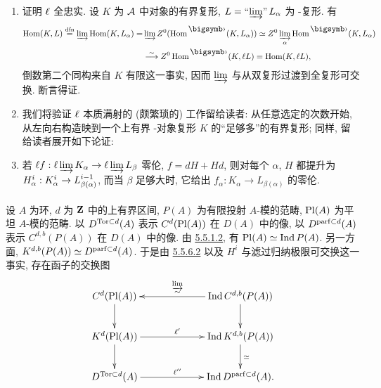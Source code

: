 \begin{enumerate}
\renewcommand{\theenumi}{\Alph{enumi}}
\renewcommand{\labelenumi}{\theenumi)}
\item 证明 $\ell$ 全忠实. 设 $K$ 为 ${\mathcal A}$ 中对象的有界复形, $L=\operatorname*{\text{``$\varinjlim$''}}
L_{\alpha}$ 为 \iInd-复形. 有
\begin{align*}
\Hom(K,L)\overset{\dfn}{=} \varinjlim \Hom(K,L_{\alpha})  = & \varinjlim
Z^{0}(\Hom^{\bigdot} (K,L_{\alpha}))\simeq Z^{0}
\varinjlim_{\alpha} \Hom^{\bigdot} (K,L_{\alpha})\\
& \isomto
Z^{0} \Hom^{\bigdot} (K,\ell L)=\Hom(K,\ell L){\quoi},
\end{align*}
倒数第二个同构来自 $K$ 有限这一事实, 因而 $\varinjlim$ 与从双复形过渡到全复形可交换. 断言得证.

\item 我们\pageoriginale 将验证 $\ell$ 本质满射的 (颇繁琐的) 工作留给读者: 从任意选定的次数开始, 从左向右构造映到一个上有界 \iInd-对象复形 $K$ 的“足够多”的有界复形; 同样, 留给读者展开如下论证:

\item 若 $\ell f:\ell \varinjlim K_{\alpha}\rightarrow \ell \varinjlim
L_{\beta}$ 零伦, $f=dH+Hd$, 则对每个 $\alpha$, $H$ 都提升为 $H^{i}_{\alpha}:K^{i}_{\alpha}\rightarrow
L^{i-1}_{\beta(\alpha)}$, 而当 $\beta$ 足够大时, 它给出 $f_{\alpha}:K_{\alpha}\rightarrow L_{\beta(\alpha)}$ 的零伦.
\end{enumerate}

\setcounter{subsubsection}{6}
\setcounter{paragraph}{2}
\paragraph{}
设 $A$ 为环, $d$ 为 $\mathbf{Z}$ 中的上有界区间, $P(A)$ 为有限投射 $A$-模的范畴, $\operatorname{Pl}(A)$ 为平坦 $A$-模的范畴. 以 $D^{\operatorname{Tor}\subset d}(A)$ 表示 $C^{d}(\operatorname{Pl}(A))$ 在 $D(A)$ 中的像, 以 $D^{\operatorname{parf}\subset d}(A)$ 表示 $C^{d,b}(P(A))$ 在 $D(A)$ 中的像. 由 \hyperref[XVII.par5.5.1.2]{5.5.1.2}, 有 $\operatorname{Pl}(A)\simeq \operatorname{Ind}
P(A)$. 另一方面, $K^{d,b}(P(A))\simeq D^{\operatorname{parf}\subset d}(A)$. 于是由 \hyperref[XVII.lem5.5.6.2]{5.5.6.2} 以及 $H^{i}$ 与滤过归纳极限可交换这一事实, 存在函子的交换图
$$
\xymatrix@C=2.25cm{
C^{d}(\text{Pl}(A)) \ar[d]& \Ind C^{d,b}(P(A)) \ar[d]\ar[l]_{\substack{\varinjlim\\\sim}}\\
K^{d}(\text{Pl}(A)) \ar[d]\ar[r]^{\ell'}& \Ind K^{d,b}(P(A)) \ar[d]^{\sisi{}{\simeq}}\\
D^{\Tor\subset d}(A) \ar[r]^{\ell''}& \Ind D^{\parf \subset d}(A).
}
$$

